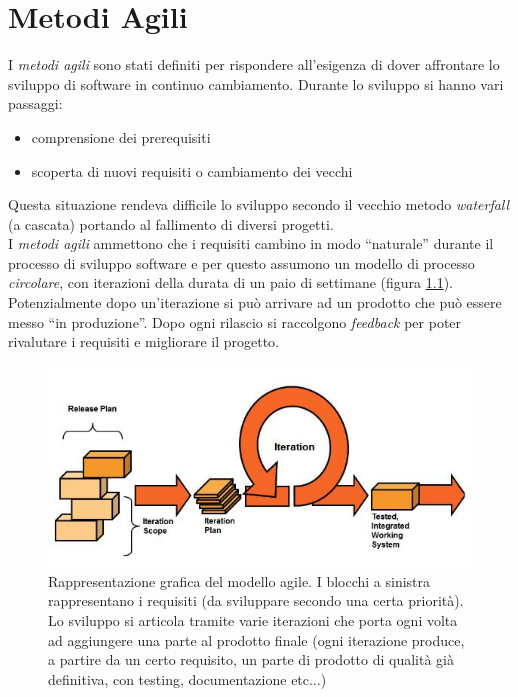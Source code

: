 \documentclass[a4paper,12pt, oneside]{book}
\begin{document}
\chapter{Metodi Agili}
I \textit{metodi agili} sono stati definiti per rispondere all'esigenza di dover
affrontare lo sviluppo di software in continuo cambiamento. Durante lo sviluppo
si hanno vari passaggi:
\begin{itemize}
  \item comprensione dei prerequisiti
  \item scoperta di nuovi requisiti o cambiamento dei vecchi
\end{itemize}
Questa situazione rendeva difficile lo sviluppo secondo il vecchio metodo
\textit{waterfall} (a cascata) portando al fallimento di diversi progetti.\\
I \textit{metodi agili} ammettono che i requisiti cambino in modo ``naturale''
durante il processo di sviluppo software e per questo assumono un modello di
processo \textit{circolare}, con iterazioni della durata di un paio di settimane
(figura \ref{agile}). Potenzialmente dopo un'iterazione si può arrivare ad un
prodotto che può essere messo ``in produzione''. Dopo ogni rilascio si
raccolgono \textit{feedback} per poter rivalutare i requisiti e migliorare il
progetto.\\
\begin{figure}
  \centering
  \includegraphics[scale = 0.6]{img/agile.jpg}
  \caption{Rappresentazione grafica del modello agile. I blocchi a sinistra
    rappresentano i requisiti (da sviluppare secondo una certa priorità). Lo
    sviluppo si articola tramite varie iterazioni che porta ogni volta ad
    aggiungere una parte al prodotto finale (ogni iterazione produce, a partire
    da un certo requisito, un parte di
    prodotto di qualità già definitiva, con testing, documentazione
    etc$\ldots$)}
  \label{agile}
\end{figure}
\end{document}
